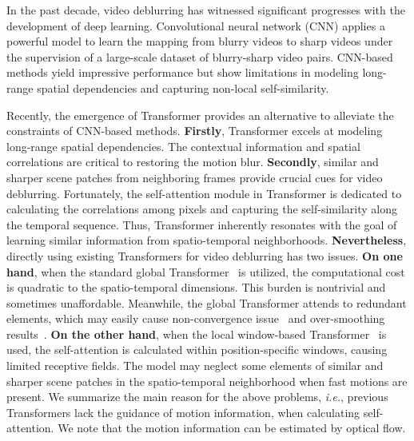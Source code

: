 \documentclass{article}
\begin{document}
	In the past decade, video deblurring has witnessed significant progresses with the development of deep learning. Convolutional neural network (CNN) applies a powerful model to learn the mapping from blurry videos to sharp videos under the supervision of a large-scale dataset of blurry-sharp video pairs. CNN-based methods yield impressive performance but show limitations in modeling long-range spatial dependencies and capturing non-local self-similarity.
	
	Recently, the emergence of Transformer provides an alternative to alleviate the constraints of CNN-based methods. \textbf{Firstly}, Transformer excels at modeling long-range spatial dependencies. The contextual information and spatial correlations are critical to restoring the motion blur. \textbf{Secondly}, similar and sharper scene patches from neighboring frames provide crucial cues for video deblurring. Fortunately, the self-attention module in Transformer is dedicated to calculating the correlations among pixels and capturing the self-similarity along the temporal sequence. Thus, Transformer inherently resonates with the goal of learning similar information from spatio-temporal neighborhoods. \textbf{Nevertheless}, directly using existing  Transformers for video deblurring has two issues. \textbf{On one hand}, when the standard global Transformer~\cite{global_msa} is utilized, the computational cost is quadratic to the spatio-temporal dimensions. This burden is nontrivial and sometimes unaffordable. Meanwhile, the global Transformer attends to redundant  elements, which may easily cause non-convergence issue~\cite{de_detr} and over-smoothing results~\cite{xiangtl_gald}. \textbf{On the other hand}, when the local window-based Transformer~\cite{liu2021swin} is used, the self-attention is calculated within position-specific windows, causing limited receptive fields. The model may neglect some  elements of similar and sharper scene patches in the spatio-temporal neighborhood when fast motions are present. We summarize the main reason for the above problems, \emph{i.e.}, previous Transformers lack the guidance of motion information, when calculating self-attention. We note that the motion information can be estimated by optical flow.
	
\end{document}
